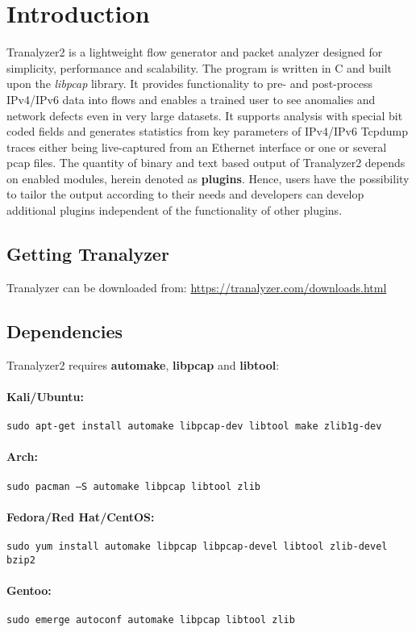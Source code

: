 \section{Introduction}
Tranalyzer2 is a lightweight flow generator and packet analyzer designed for simplicity, performance and scalability. The program is written in C and built upon the {\em libpcap} library. It provides functionality to pre- and post-process IPv4/IPv6 data into flows and enables a trained user to see anomalies and network defects even in very large datasets. It supports analysis with special bit coded fields and generates statistics from key parameters of IPv4/IPv6 Tcpdump traces either being live-captured from an Ethernet interface or one or several pcap files. The quantity of binary and text based output of Tranalyzer2 depends on enabled modules, herein denoted as {\bf plugins}. Hence, users have the possibility to tailor the output according to their needs and developers can develop additional plugins independent of the functionality of other plugins.

\subsection{Getting Tranalyzer}
Tranalyzer can be downloaded from: \url{https://tranalyzer.com/downloads.html}

\subsection{Dependencies}
Tranalyzer2 requires {\bf automake}, {\bf libpcap} and {\bf libtool}:

\paragraph{Kali/Ubuntu:} {\tt sudo apt-get install automake libpcap-dev libtool make zlib1g-dev}
\paragraph{Arch:} {\tt sudo pacman --S automake libpcap libtool zlib}
\paragraph{Fedora/Red Hat/CentOS:} {\tt sudo yum install automake libpcap libpcap-devel libtool zlib-devel bzip2}
\paragraph{Gentoo:} {\tt sudo emerge autoconf automake libpcap libtool zlib}
